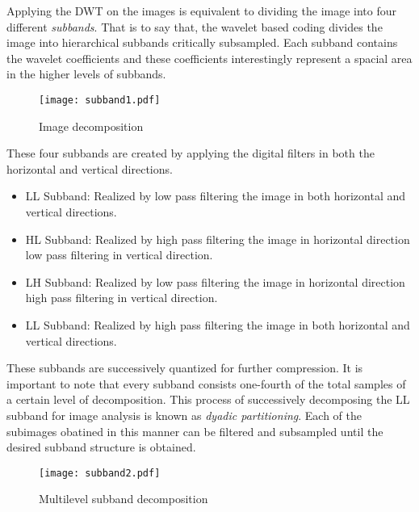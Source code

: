 \documentclass[./A14_Report.tex]{subfiles}
\begin{document}
\par

Applying the DWT on the images is equivalent to dividing the image into four
different \textit{subbands}. That is to say that, the wavelet based coding
divides the image into hierarchical subbands critically subsampled. Each
subband contains the wavelet coefficients and these coefficients interestingly
represent a spacial area in the higher levels of subbands.

\FloatBarrier
\begin{figure}[htpb]
    \centering
    \texttt{[image: subband1.pdf]}
    \caption{Image decomposition}%
    \label{fig:subband1}
\end{figure}
\FloatBarrier

\pagebreak

These four subbands are created by applying the digital filters in both the
horizontal and vertical directions.
\begin{itemize}
    \item LL Subband: Realized by low pass filtering the image in both
        horizontal and vertical directions.
    \item HL Subband: Realized by high pass filtering the image in horizontal
        direction low pass filtering in vertical direction.
    \item LH Subband: Realized by low pass filtering the image in horizontal
        direction high pass filtering in vertical direction.
    \item LL Subband: Realized by high pass filtering the image in both
        horizontal and vertical directions.
\end{itemize}

These subbands are successively quantized for further compression. It is
important to note that every subband consists one-fourth of the total samples
of a certain level of decomposition.  This process of successively decomposing
the LL subband for image analysis is known as \textit{dyadic partitioning}.
Each of the subimages obatined in this manner can be filtered and subsampled
until the desired subband structure is obtained.

\FloatBarrier
\begin{figure}[htpb]
    \centering
    \texttt{[image: subband2.pdf]}
    \caption{Multilevel subband decomposition}%
    \label{fig:subband2}
\end{figure}
\FloatBarrier
\end{document}
